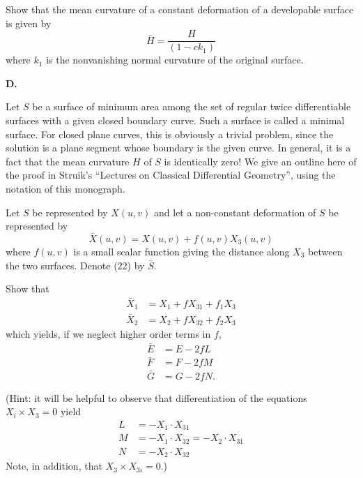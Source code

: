 \documentclass{book}
\begin{document}
Show that the mean curvature of a constant deformation of a developable surface is given by
\begin{equation}
\bar{H} = \frac{H}{(1 - ck_{1})}
\end{equation}
where $k_{1}$ is the nonvanishing normal curvature of the original surface.

\vspace{0.3cm}

\noindent \textbf{D.} 

\vspace{0.3cm}

Let $S$ be a surface of minimum area among the set of regular twice differentiable surfaces with a given closed boundary curve. Such a surface is called a minimal surface. For closed plane curves, this is obviously a trivial problem, since the solution is a plane segment whose boundary is the given curve. In general, it is a fact that the mean curvature $H$ of $S$ is identically zero! We give an outline here of the proof in Struik's ``Lectures on Classical Differential Geometry'', using the notation of this monograph.

Let $S$ be represented by $X(u,v)$ and let a non-constant deformation of $S$ be represented by
\begin{equation}
\bar{X}(u,v) = X(u,v) + f(u,v) X_{3}(u,v)
\end{equation}
where $f(u,v)$ is a small scalar function giving the distance along $X_3$ between the two surfaces. Denote (22) by $\bar{S}$.

Show that
\begin{align}
\bar{X}_{1} & = X_{1} + fX_{31} + f_{1}X_{3} \\
\bar{X}_{2} & = X_{2} + fX_{32} + f_{2} X_{3}
\end{align}
which yields, if we neglect higher order terms in $f$,
\begin{align}
\bar{E} & = E - 2fL \\
\bar{F} & = F - 2fM \\
\bar{G} & = G - 2fN.
\end{align}

(Hint: it will be helpful to observe that differentiation of the equations $X_{i} \times X_{3} = 0$ yield
\begin{align*}
L & = - X_{1} \cdot X_{31} \\
M & = - X_{1} \cdot X_{32} = - X_{2} \cdot X_{31} \\
N & = - X_{2} \cdot X_{32}
\end{align*}
Note, in addition, that $X_{3} \times X_{3i} = 0$.) 
\end{document}
